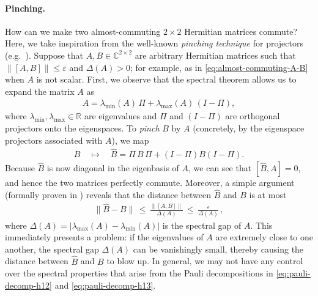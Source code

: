 \documentclass[a4paper,onecolumn,11pt]{quantumarticle}
\theoremstyle{plain}
\newcommand{\eps}{\varepsilon}
\begin{document}
\paragraph{Pinching.} How can we make two almost-commuting $2 \times 2$ Hermitian matrices commute? Here, we take inspiration from the well-known \emph{pinching technique} for projectors (e.g.~\cite{overlapping}). Suppose that $A,B \in \mathbb{C}^{2 \times 2}$ are arbitrary Hermitian matrices such that $\|[A,B]\| \leq \eps$ and $\Delta(A)>0$; for example, as in \eqref{eq:almost-commuting-A-B} when $A$ is not scalar. First, we observe that the spectral theorem allows us to expand the matrix $A$ as 
\begin{align}
A = \lambda_{\min}(A) \, \Pi + \lambda_{\max}(A) \, (I -\Pi),
\end{align}
where $\lambda_{\min},\lambda_{\max} \in \mathbb{R}$ are eigenvalues and $\Pi$ and $(I -\Pi)$ are orthogonal projectors onto the eigenspaces. To \emph{pinch} $B$ by $A$ (concretely, by the eigenspace projectors associated with $A$), we map
\begin{align}\label{eq:ex-pinchining}
B \quad \mapsto \quad \hat{B} = \Pi \, B \, \Pi + (I-\Pi) B (I-\Pi).     
\end{align}
Because $\hat{B}$ is now diagonal in the eigenbasis of $A$, we can see that $[\hat{B},A]=0$, and hence the two matrices perfectly commute. Moreover, a simple argument (formally proven in ) reveals that the distance between $\hat B$ and $B$ is at most
\begin{align}\label{eq:pinching-for-B}
\|\hat{B} - B\| \, \leq \, \frac{\|[A,B]\|}{\Delta(A)} \, \leq \, \frac{\eps}{\Delta(A)} \, ,
\end{align}
where $\Delta(A) = |\lambda_{\max}(A) - \lambda_{\min}(A)|$ is the spectral gap of $A$. This immediately presents a problem: if the eigenvalues of $A$ are extremely close to one another, the spectral gap $\Delta(A)$ can be vanishingly small, thereby causing the distance between $\hat{B}$ and $B$ to blow up. In general, we may not have any control over the spectral properties that arise from the Pauli decompositions in \eqref{eq:pauli-decomp-h12} and \eqref{eq:pauli-decomp-h13}. 
\end{document}
